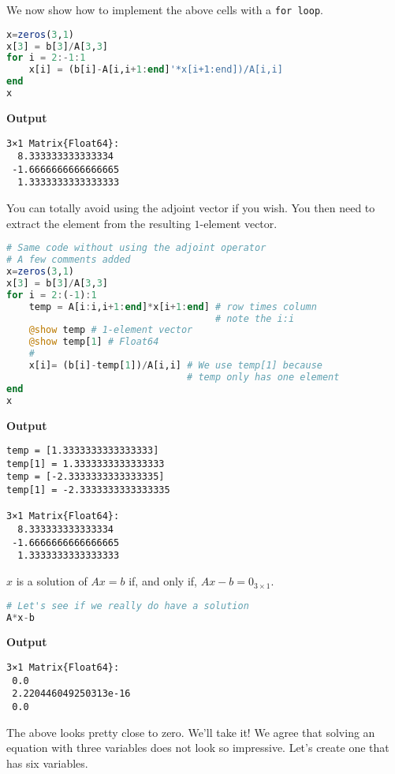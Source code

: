 We now show how to implement the above cells with a  \texttt{for\,loop}.\\

\begin{lstlisting}[language=Julia,style=mystyle]
x=zeros(3,1)
x[3] = b[3]/A[3,3]
for i = 2:-1:1
    x[i] = (b[i]-A[i,i+1:end]'*x[i+1:end])/A[i,i]
end
x
\end{lstlisting}
\textbf{Output} 
\begin{verbatim}
3×1 Matrix{Float64}:
  8.333333333333334
 -1.6666666666666665
  1.3333333333333333
\end{verbatim}

You can totally avoid using the adjoint vector if you wish. You then need to extract the element from the resulting $1$-element vector.

\begin{lstlisting}[language=Julia,style=mystyle]
# Same code without using the adjoint operator
# A few comments added
x=zeros(3,1)
x[3] = b[3]/A[3,3]
for i = 2:(-1):1
    temp = A[i:i,i+1:end]*x[i+1:end] # row times column
                                     # note the i:i
    @show temp # 1-element vector
    @show temp[1] # Float64
    #
    x[i]= (b[i]-temp[1])/A[i,i] # We use temp[1] because
                                # temp only has one element
end
x
\end{lstlisting}
\textbf{Output} 
\begin{verbatim}
temp = [1.3333333333333333]
temp[1] = 1.3333333333333333
temp = [-2.3333333333333335]
temp[1] = -2.3333333333333335

3×1 Matrix{Float64}:
  8.333333333333334
 -1.6666666666666665
  1.3333333333333333
\end{verbatim}


$x$ is a solution of $Ax = b$ if, and only if, $Ax-b = 0_{3 \times 1}.$ 

\begin{lstlisting}[language=Julia,style=mystyle]
# Let's see if we really do have a solution
A*x-b
\end{lstlisting}
\textbf{Output} 
\begin{verbatim}
3×1 Matrix{Float64}:
 0.0
 2.220446049250313e-16
 0.0
\end{verbatim}
The above looks pretty close to zero. We'll take it! We agree that solving an equation with three variables does not look so  impressive. Let's create one that has six variables. 

